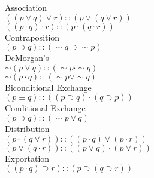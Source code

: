 \documentclass[12pt]{article}
\begin{document}
Association\\
$((p\lor q)\lor r) :: (p\lor (q\lor r))$\\
$((p\cdot q)\cdot r) :: (p\cdot(q\cdot r))$\\

Contraposition\\
$(p\supset q) :: (\sim q\supset \sim p)$\\

DeMorgan's\\
$\sim(p\lor q) :: (\sim p\cdot \sim q)$\\
$\sim(p\cdot q) :: (\sim p\lor \sim q)$\\

Biconditional Exchange\\
$(p\equiv q) :: ((p\supset q)\cdot(q\supset p))$\\

Conditional Exchange\\
$(p\supset q) :: (\sim p\lor q)$\\

Distribution\\
$(p\cdot(q\lor r)) :: ((p\cdot q)\lor(p\cdot r))$\\
$(p\lor (q\cdot r)) :: ((p\lor q)\cdot (p\lor r))$\\

Exportation\\
$((p\cdot q)\supset r) :: (p\supset(q\supset r))$ 
\end{document}
